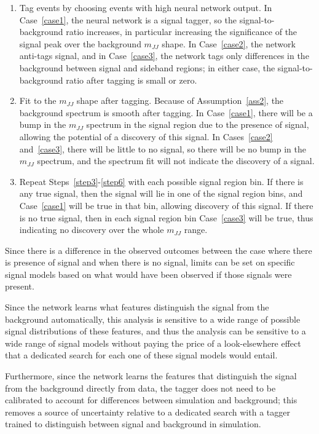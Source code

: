 \begin{enumerate}
  \label{step4}
  \item Tag events by choosing events with high neural network output.
    In Case~\ref{case1}, the neural network is a signal tagger, so the signal-to-background ratio increases, in particular increasing the significance of the signal peak over the background $m_{JJ}$ shape. 
    In Case~\ref{case2}, the network anti-tags signal, and in Case~\ref{case3}, the network tags only differences in the background between signal and sideband regions; in either case, the signal-to-background ratio after tagging is small or zero.
  \label{step5}
  \item Fit to the $m_{JJ}$ shape after tagging.
    Because of Assumption~\ref{ass2}, the background spectrum is smooth after tagging.
    In Case~\ref{case1}, there will be a bump in the $m_{JJ}$ spectrum in the signal region due to the presence of signal, allowing the potential of a discovery of this signal.
    In Cases~\ref{case2} and~\ref{case3}, there will be little to no signal, so there will be no bump in the $m_{JJ}$ spectrum, and the spectrum fit will not indicate the discovery of a signal.
    \label{step6}
  \item Repeat Steps~\ref{step3}-\ref{step6} with each possible signal region bin.
    If there is any true signal, then the signal will lie in one of the signal region bins, and Case~\ref{case1} will be true in that bin, allowing discovery of this signal.
    If there is no true signal, then in each signal region bin Case~\ref{case3} will be true, thus indicating no discovery over the whole $m_{JJ}$ range.
\end{enumerate}
Since there is a difference in the observed outcomes between the case where there is presence of signal and when there is no signal, limits can be set on specific signal models based on what would have been observed if those signals were present.

Since the network learns what features distinguish the signal from the background automatically, this analysis is sensitive to a wide range of possible signal distributions of these features, and thus the analysis can be sensitive to a wide range of signal models without paying the price of a look-elsewhere effect that a dedicated search for each one of these signal models would entail.

Furthermore, since the network learns the features that distinguish the signal from the background directly from data, the tagger does not need to be calibrated to account for differences between simulation and background; this removes a source of uncertainty relative to a dedicated search with a tagger trained to distinguish between signal and background in simulation.

